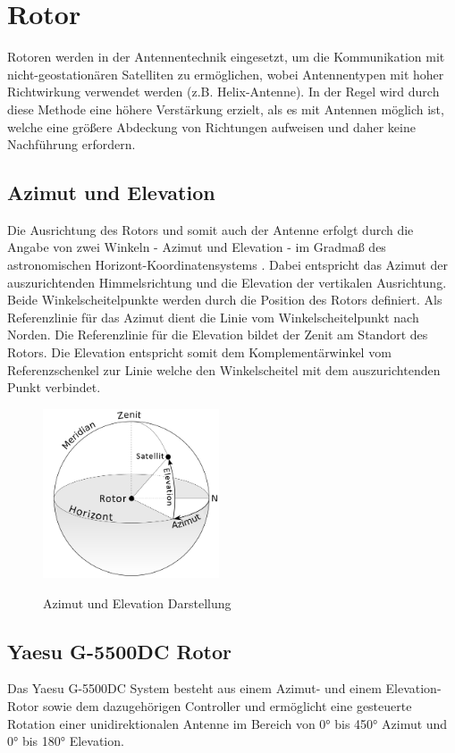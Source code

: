 \chapter{Rotor}
Rotoren werden in der Antennentechnik eingesetzt, um die Kommunikation mit nicht-geostationären Satelliten zu ermöglichen, wobei Antennentypen mit hoher Richtwirkung verwendet werden (z.B. Helix-Antenne). In der Regel wird durch diese Methode eine höhere Verstärkung erzielt, als es mit Antennen möglich ist, welche eine größere Abdeckung von Richtungen aufweisen und daher keine Nachführung erfordern. 
\section{Azimut und Elevation}
Die Ausrichtung des Rotors und somit auch der Antenne erfolgt durch die Angabe von zwei Winkeln - Azimut und Elevation - im Gradmaß des astronomischen Horizont-Koordinatensystems \cite{noauthor_astronomische_nodate}. Dabei entspricht das Azimut der auszurichtenden Himmelsrichtung und die Elevation der vertikalen Ausrichtung. Beide Winkelscheitelpunkte werden durch die Position des Rotors definiert. Als Referenzlinie für das Azimut dient die Linie vom Winkelscheitelpunkt nach Norden. Die Referenzlinie für die Elevation bildet der Zenit am Standort des Rotors. Die Elevation entspricht somit dem Komplementärwinkel vom Referenzschenkel zur Linie welche den Winkelscheitel mit dem auszurichtenden Punkt verbindet.

\begin{figure}[H]
	\cite{twcarlson_azimuth_2020}
	\centering
	\includegraphics[width=5.2cm]{../ref/Azimuth-Altitude_schematic_satellit.png}
	\label{fig:Azimut_Elevation_Schematic}
	\caption{Azimut und Elevation Darstellung}
\end{figure}

\section{Yaesu G-5500DC Rotor}
Das Yaesu G-5500DC System \cite{noauthor_yaesu_nodate} besteht aus einem Azimut- und einem Elevation-Rotor sowie dem dazugehörigen Controller und ermöglicht eine gesteuerte Rotation einer unidirektionalen Antenne im Bereich von 0° bis 450° Azimut und 0° bis 180° Elevation.

